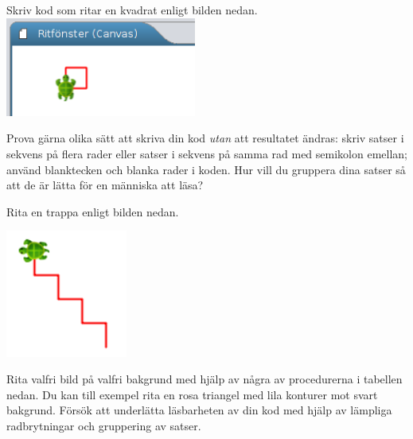 \Subtask Skriv kod som ritar en kvadrat enligt bilden nedan.
\vspace{1em}\\\includegraphics[width=0.47\textwidth]{../img/kojo/kvadrat}

\noindent Prova gärna olika sätt att skriva din kod \emph{utan} att resultatet ändras: skriv satser i sekvens på flera rader eller satser i sekvens på samma rad med semikolon emellan; använd blanktecken och blanka rader i koden. Hur vill du gruppera dina satser så att de är lätta för en människa att läsa?


\Subtask Rita en trappa enligt bilden nedan.

\includegraphics[width=0.3\textwidth]{../img/kojo/stairs}

\Subtask Rita valfri bild på valfri bakgrund med hjälp av några av procedurerna i tabellen nedan. Du kan till exempel rita en rosa triangel med lila konturer mot svart bakgrund. %
Försök att underlätta läsbarheten av din kod med hjälp av lämpliga radbrytningar och gruppering av satser. 


